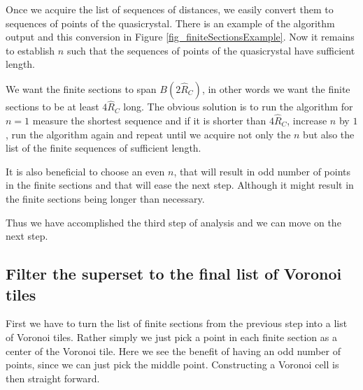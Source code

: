 \documentclass[text.tex]{subfiles}
\begin{document}
Once we acquire the list of sequences of distances, we easily convert them to sequences of points of the quasicrystal. There is an example of the algorithm output and this conversion in Figure \ref{fig_finiteSectionsExample}. Now it remains to establish $n$ such that the sequences of points of the quasicrystal have sufficient length.

We want the finite sections to span $B(2\hat{R}_C)$, in other words we want the finite sections to be at least $4\hat{R}_C$ long. The obvious solution is to run the algorithm for $n=1$ measure the shortest sequence and if it is shorter than $4\hat{R}_C$, increase $n$ by $1$, run the algorithm again and repeat until we acquire not only the $n$ but also the list of the finite sequences of sufficient length. 

It is also beneficial to choose an even $n$, that will result in odd number of points in the finite sections and that will ease the next step. Although it might result in the finite sections being longer than necessary. 

Thus we have accomplished the third step of analysis and we can move on the next step. 

\subsection{Filter the superset to the final list of Voronoi tiles}
First we have to turn the list of finite sections from the previous step into a list of Voronoi tiles. Rather simply we just pick a point in each finite section as a center of the Voronoi tile. Here we see the benefit of having an odd number of points, since we can just pick the middle point. Constructing a Voronoi cell is then straight forward. 
\end{document}

